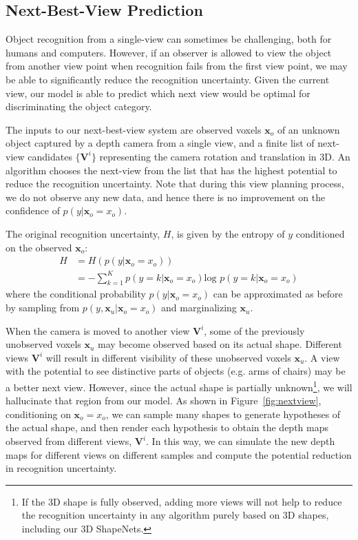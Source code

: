 \documentclass[10pt,twocolumn,letterpaper]{article}
\begin{document}
\subsection{Next-Best-View Prediction}





Object recognition from a single-view can sometimes be challenging, both for humans and computers. 
However, if an observer is allowed to view the object from another view point when recognition fails from the first view point, we may be able to significantly reduce the recognition uncertainty. 
Given the current view, our model is able to predict which next view would be optimal for discriminating the object category.


The inputs to our next-best-view system are observed voxels $\mathbf{x}_o$ of an unknown object captured by a depth camera from a single view, and  a finite list of next-view candidates $\{\mathbf{V}^i\}$ representing the camera rotation and translation in 3D.
An algorithm chooses the next-view from the list 
that has the highest potential to reduce the recognition uncertainty. 
Note that during this view planning process, we do not observe any new data, and hence there is no improvement on the confidence of $p(y|\mathbf{x}_o=x_o)$. 

The original recognition uncertainty, $H$, is given by the entropy of $y$ conditioned on the observed $\mathbf{x}_o$:
\begin{equation}
\begin{split}
H &= H\left(p(y|\mathbf{x}_o=x_o)\right) \\
&= -\sum_{k=1}^{K} p(y=k|\mathbf{x}_o=x_o) \textrm{log }p(y=k|\mathbf{x}_o=x_o)
\end{split}
\end{equation}
where the conditional probability $p(y|\mathbf{x}_o=x_o)$ can be approximated as before by sampling from $p(y,\mathbf{x}_u|\mathbf{x}_o=x_o)$ and marginalizing $\mathbf{x}_u$. 



When the camera is moved to another view $\mathbf{V}^i$,
some of the previously unobserved voxels $\mathbf{x}_u$ may become observed based on its actual shape. 
Different views $\mathbf{V}^i$ will result in different visibility of these unobserved voxels $\mathbf{x}_u$.
A view with the potential to see distinctive parts of objects (e.g. arms of chairs) 
may be a better next view.
However, since the actual shape is partially unknown\footnote{If the 3D shape is fully observed, adding more views will not help to reduce the recognition uncertainty in any algorithm purely based on 3D shapes,
including our 3D ShapeNets.},
we will hallucinate that region from our model.
As shown in Figure~\ref{fig:nextview},
conditioning on $\mathbf{x}_o=x_o$,
we can sample many shapes to generate hypotheses of the actual shape, 
and then render each hypothesis to obtain the depth maps observed from different views, $\mathbf{V}^i$.
In this way, we can simulate the new depth maps for different views on different samples
and compute the potential reduction in recognition uncertainty.
\end{document}
